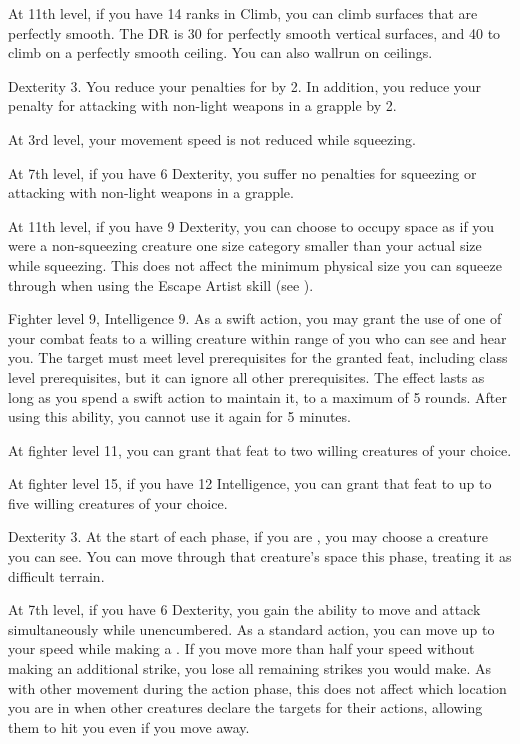     At 11th level, if you have 14 ranks in Climb, you can climb surfaces that are perfectly smooth.
    The DR is 30 for perfectly smooth vertical surfaces, and 40 to climb on a perfectly smooth ceiling.
    You can also wallrun on ceilings.

    \featpre Dexterity 3.
    \featben You reduce your penalties for  by 2. In addition, you reduce your penalty for attacking with non-light weapons in a grapple by 2.

    At 3rd level, your movement speed is not reduced while squeezing.

    At 7th level, if you have 6 Dexterity, you suffer no penalties for squeezing or attacking with non-light weapons in a grapple.

    At 11th level, if you have 9 Dexterity, you can choose to occupy space as if you were a non-squeezing creature one size category smaller than your actual size while squeezing.
    This does not affect the minimum physical size you can squeeze through when using the Escape Artist skill (see ).

    \featpres Fighter level 9, Intelligence 9.
    \featben As a swift action, you may grant the use of one of your combat feats to a willing creature within \rngmed range of you who can see and hear you.
    The target must meet level prerequisites for the granted feat, including class level prerequisites, but it can ignore all other prerequisites.
    The effect lasts as long as you spend a swift action to maintain it, to a maximum of 5 rounds.
    After using this ability, you cannot use it again for 5 minutes.

    At fighter level 11, you can grant that feat to two willing creatures of your choice.

    At fighter level 15, if you have 12 Intelligence, you can grant that feat to up to five willing creatures of your choice.

    \featpres Dexterity 3.
    \featben At the start of each phase, if you are , you may choose a creature you can see.
    You can move through that creature's space this phase, treating it as difficult terrain.

    At 7th level, if you have 6 Dexterity, you gain the ability to move and attack simultaneously while unencumbered.
    As a standard action, you can move up to your speed while making a .
    If you move more than half your speed without making an additional strike, you lose all remaining strikes you would make.
    As with other movement during the action phase, this does not affect which location you are in when other creatures declare the targets for their actions, allowing them to hit you even if you move away.

